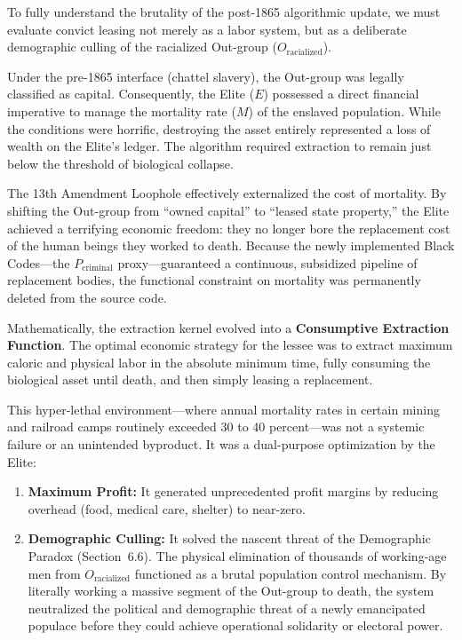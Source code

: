 \documentclass[12pt,openany]{book}
\begin{document}
To fully understand the brutality of the post-1865 algorithmic update, we must evaluate convict leasing not merely as a labor system, but as a deliberate demographic culling of the racialized Out-group ($O_{\text{racialized}}$).

Under the pre-1865 interface (chattel slavery), the Out-group was legally classified as capital. Consequently, the Elite ($E$) possessed a direct financial imperative to manage the mortality rate ($M$) of the enslaved population. While the conditions were horrific, destroying the asset entirely represented a loss of wealth on the Elite's ledger. The algorithm required extraction to remain just below the threshold of biological collapse.

The 13th Amendment Loophole effectively externalized the cost of mortality. By shifting the Out-group from ``owned capital'' to ``leased state property,'' the Elite achieved a terrifying economic freedom: they no longer bore the replacement cost of the human beings they worked to death. Because the newly implemented Black Codes---the $P_{\text{criminal}}$ proxy---guaranteed a continuous, subsidized pipeline of replacement bodies, the functional constraint on mortality was permanently deleted from the source code.

Mathematically, the extraction kernel evolved into a \textbf{Consumptive Extraction Function}. The optimal economic strategy for the lessee was to extract maximum caloric and physical labor in the absolute minimum time, fully consuming the biological asset until death, and then simply leasing a replacement.

This hyper-lethal environment---where annual mortality rates in certain mining and railroad camps routinely exceeded 30 to 40 percent---was not a systemic failure or an unintended byproduct. It was a dual-purpose optimization by the Elite:

\begin{enumerate}
    \item \textbf{Maximum Profit:} It generated unprecedented profit margins by reducing overhead (food, medical care, shelter) to near-zero.

    \item \textbf{Demographic Culling:} It solved the nascent threat of the Demographic Paradox (Section~6.6). The physical elimination of thousands of working-age men from $O_{\text{racialized}}$ functioned as a brutal population control mechanism. By literally working a massive segment of the Out-group to death, the system neutralized the political and demographic threat of a newly emancipated populace before they could achieve operational solidarity or electoral power.
\end{enumerate}
\end{document}
